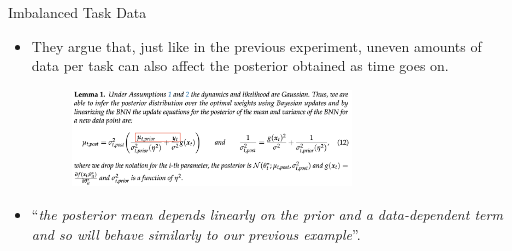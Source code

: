 \documentclass[12pt,aspectratio=169, handout]{beamer}
\let\olditem\item
\renewcommand\item{\olditem\justifying}
\begin{document}
\begin{frame}{Imbalanced Task Data}
    



    \begin{itemize}
        \item They argue that, just like in the previous experiment, uneven amounts of data per task can also affect the posterior obtained as time goes on.
        \begin{figure}
    		\centering
    		\includegraphics[width=0.7\textwidth]{"images/lemma1_annotated.png"}
    	\end{figure}
        \pause
        \item ``\textit{the posterior mean depends linearly on the prior and a data-dependent term and so will behave similarly to our previous example}''.
    \end{itemize}

\end{frame}
\end{document}
